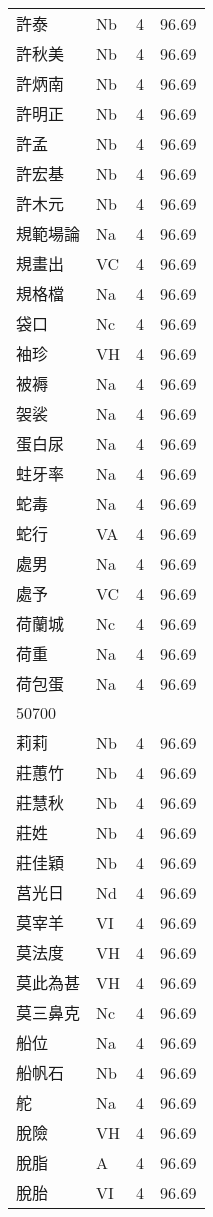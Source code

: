 \documentclass[twocolumn]{book}
\begin{document}
\begin{supertabular}{llrr}
許泰 & Nb & 4 &  96.69\\
許秋美 & Nb & 4 &  96.69\\
許炳南 & Nb & 4 &  96.69\\
許明正 & Nb & 4 &  96.69\\
許孟 & Nb & 4 &  96.69\\
許宏基 & Nb & 4 &  96.69\\
許木元 & Nb & 4 &  96.69\\
規範場論 & Na & 4 &  96.69\\
規畫出 & VC & 4 &  96.69\\
規格檔 & Na & 4 &  96.69\\
袋口 & Nc & 4 &  96.69\\
袖珍 & VH & 4 &  96.69\\
被褥 & Na & 4 &  96.69\\
袈裟 & Na & 4 &  96.69\\
蛋白尿 & Na & 4 &  96.69\\
蛀牙率 & Na & 4 &  96.69\\
蛇毒 & Na & 4 &  96.69\\
蛇行 & VA & 4 &  96.69\\
處男 & Na & 4 &  96.69\\
處予 & VC & 4 &  96.69\\
荷蘭城 & Nc & 4 &  96.69\\
荷重 & Na & 4 &  96.69\\
荷包蛋 & Na & 4 &  96.69\\
50700\\
莉莉 & Nb & 4 &  96.69\\
莊蕙竹 & Nb & 4 &  96.69\\
莊慧秋 & Nb & 4 &  96.69\\
莊姓 & Nb & 4 &  96.69\\
莊佳穎 & Nb & 4 &  96.69\\
莒光日 & Nd & 4 &  96.69\\
莫宰羊 & VI & 4 &  96.69\\
莫法度 & VH & 4 &  96.69\\
莫此為甚 & VH & 4 &  96.69\\
莫三鼻克 & Nc & 4 &  96.69\\
船位 & Na & 4 &  96.69\\
船帆石 & Nb & 4 &  96.69\\
舵 & Na & 4 &  96.69\\
脫險 & VH & 4 &  96.69\\
脫脂 & A & 4 &  96.69\\
脫胎 & VI & 4 &  96.69\\

\end{supertabular}
\end{document}
